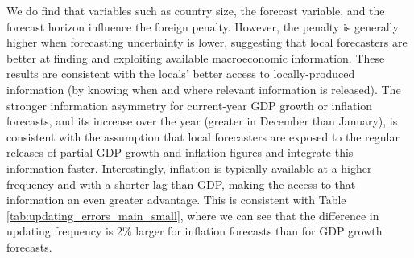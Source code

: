 We do find that variables such as country size, the forecast variable, and the forecast horizon influence the foreign penalty. However, the penalty is generally higher when forecasting uncertainty is lower, suggesting that local forecasters are better at finding and exploiting available macroeconomic information. These results are consistent with the locals' better access to locally-produced information (by knowing when and where relevant information is released). The stronger information asymmetry for current-year GDP growth or inflation forecasts, and its increase over the year (greater in December than January), is consistent with the assumption that local forecasters are exposed to the regular releases of partial GDP growth and inflation figures and integrate this information faster. Interestingly, inflation is typically available at a higher frequency and with a shorter lag than GDP, making the access to that information an even greater advantage. This is consistent with Table \ref{tab:updating_errors_main_small}, where we can see that the difference in updating frequency is 2\% larger for inflation forecasts than for GDP growth forecasts.
